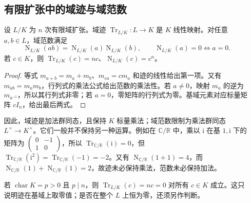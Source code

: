 \subsection{有限扩张中的域迹与域范数}
\label{b1:subsec:1802:02}

\begin{proposition}\label{b1:prop:trace-norm-basic}
	设 \(L/K\) 为 \(n\) 次有限域扩张。域迹 \(\operatorname{Tr}_{L/K}:L\rightarrow K\) 是 \(K\) 线性映射。对任意 \(a,b\in L\)，域范数满足
	\[
		\operatorname{N}_{L/K}(ab)=\operatorname{N}_{L/K}(a)\operatorname{N}_{L/K}(b), \qquad \operatorname{N}_{L/K}(a)=0\Longleftrightarrow a=0.
	\]
	若 \(c\in K\)，则 \(\operatorname{Tr}_{L/K}(c)=nc\)、\(\operatorname{N}_{L/K}(c)=c^n\)。
\end{proposition}
\begin{proof}
	等式 \(m_{a+b}=m_a+m_b\)、\(m_{ca}=c m_a\) 和迹的线性给出第一项。又有 \(m_{ab}=m_am_b\)，行列式的乘法公式给出范数的乘法性。若 \(a\ne0\)，映射 \(m_a\) 的逆为 \(m_{a^{-1}}\)，所以其行列式非零；若 \(a=0\)，零矩阵的行列式为零。基域元素对应标量矩阵 \(cI_n\)，给出最后两式。
\end{proof}
因此，域迹是加法群同态，且保持 \(K\) 标量乘法；域范数限制为乘法群同态 \(L^\times\rightarrow K^\times\)。它们一般并不保持另一种运算。例如在 \(\mathbb C/\mathbb R\) 中，乘以 \(\mathrm i\) 在基 \(1,\mathrm i\) 下的矩阵为 \(\begin{pmatrix}0&-1\\1&0\end{pmatrix}\)，所以 \(\operatorname{Tr}_{\mathbb C/\mathbb R}(\mathrm i)=0\)，但 \(\operatorname{Tr}_{\mathbb C/\mathbb R}(\mathrm i^2)=\operatorname{Tr}_{\mathbb C/\mathbb R}(-1)=-2\)。又有 \(\operatorname{N}_{\mathbb C/\mathbb R}(1+1)=4\)，而 \(\operatorname{N}_{\mathbb C/\mathbb R}(1)+\operatorname{N}_{\mathbb C/\mathbb R}(1)=2\)，故迹未必保持乘法，范数未必保持加法。

\ProseParagraphBreak

若 \(\operatorname{char}K=p>0\) 且 \(p\mid n\)，则 \(\operatorname{Tr}_{L/K}(c)=nc=0\) 对所有 \(c\in K\) 成立。这只说明迹在基域上取零值；是否在整个 \(L\) 上恒为零，还须另作判断。

\ProseParagraphBreak

